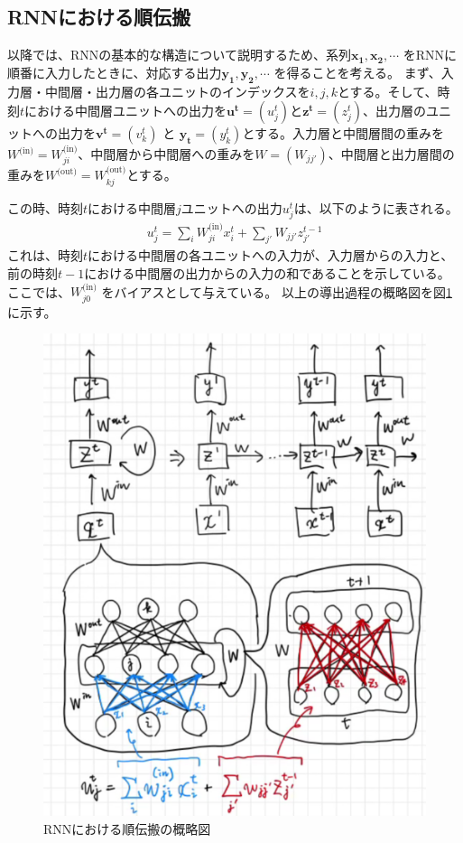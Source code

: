 \documentclass{ltjsarticle}
\begin{document}
\subsection{RNNにおける順伝搬}
以降では、RNNの基本的な構造について説明するため、系列$\mathbf{x_1}, \mathbf{x_2}, \cdots$ をRNNに順番に入力したときに、対応する出力$\mathbf{y_1}, \mathbf{y_2}, \cdots$ を得ることを考える。
まず、入力層・中間層・出力層の各ユニットのインデックスを$i, j, k$とする。そして、時刻$t$における中間層ユニットへの出力を$\mathbf{u^t} = (u^t_j)$と$\mathbf{z^t} = (z^t_j)$、出力層のユニットへの出力を$\mathbf{v^t} = (v^t_k)$ と $\mathbf{y_t}=(y^t_k)$とする。入力層と中間層間の重みを$W^{\text{(in)}} = W^{\text{(in)}}_{ji}$、中間層から中間層への重みを$W = (W_{jj'})$、中間層と出力層間の重みを$W^{\text{(out)}} = W^{\text{(out)}}_{kj}$とする。

この時、時刻$t$における中間層$j$ユニットへの出力$u^t_j$は、以下のように表される。
\begin{align}
  u^t_j = \sum_{i} W^{\text{(in)}}_{ji}x^t_i + \sum_{j'} W_{jj'}z^{t-1}_{j'}
\end{align}
これは、時刻$t$における中間層の各ユニットへの入力が、入力層からの入力と、前の時刻$t-1$における中間層の出力からの入力の和であることを示している。ここでは、$W^{\text{(in)}}_{j0}$ をバイアスとして与えている。
以上の導出過程の概略図を図\ref{fig:RNN_forward}に示す。
\begin{figure}[htbp]
  \centering
  \includegraphics[width=13cm]{./capture/RNN.png}
  \caption{RNNにおける順伝搬の概略図}
  \label{fig:RNN_forward}
\end{figure}
\end{document}
